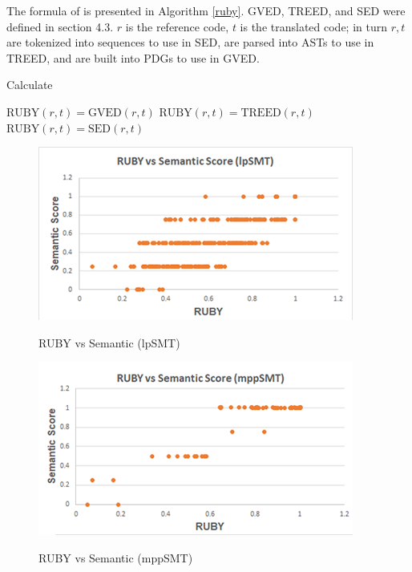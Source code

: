 The formula of {\model} is presented in Algorithm \ref{ruby}. GVED, TREED, and SED were defined in section 4.3. $r$ is the reference code, $t$ is the translated code; in turn $r,t$ are tokenized into sequences to use in SED, are parsed into ASTs to use in TREED, and are built into PDGs to use in GVED.  
\makeatletter
\def\BState{\State\hskip-\ALG@thistlm}
\makeatother
\begin{algorithm}
\caption{Calculate {\model}}\label{ruby}
\begin{algorithmic}[1]
\State $\mbox{RUBY}\left(r,t\right) = \mbox{GVED}\left(r,t\right) $
\State $\mbox{RUBY}\left(r,t\right) = \mbox{TREED}\left(r,t\right) $
\Else 
\State $\mbox{RUBY}\left(r,t\right) = \mbox{SED}\left(r,t\right) $
\EndIf
\end{algorithmic}
\end{algorithm}



\begin{figure}
\caption{RUBY vs Semantic (lpSMT)}
\centering
\includegraphics{img/rubyvssem_lpSMT.png}
\label{fig:RubySemlpSMT}
\end{figure}

\begin{figure}
\caption{RUBY vs Semantic (mppSMT)}
\centering
\includegraphics{img/rubyvssem_mppSMT.png}
\label{fig:RubySemMppSMT}
\end{figure}

